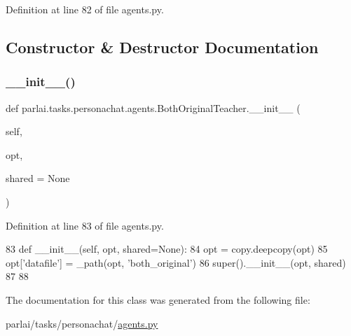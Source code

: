 Definition at line 82 of file agents.\+py.



\subsection{Constructor \& Destructor Documentation}
\mbox{\label{classparlai_1_1tasks_1_1personachat_1_1agents_1_1BothOriginalTeacher_a9d8162c6d1b012a1c9961f0aaedcb9cf}} 
\subsubsection{\texorpdfstring{\+\_\+\+\_\+init\+\_\+\+\_\+()}{\_\_init\_\_()}}
{\footnotesize\ttfamily def parlai.\+tasks.\+personachat.\+agents.\+Both\+Original\+Teacher.\+\_\+\+\_\+init\+\_\+\+\_\+ (\begin{DoxyParamCaption}\item[{}]{self,  }\item[{}]{opt,  }\item[{}]{shared = {\ttfamily None} }\end{DoxyParamCaption})}



Definition at line 83 of file agents.\+py.


\begin{DoxyCode}
83     \textcolor{keyword}{def }\_\_init\_\_(self, opt, shared=None):
84         opt = copy.deepcopy(opt)
85         opt[\textcolor{stringliteral}{'datafile'}] = \_path(opt, \textcolor{stringliteral}{'both\_original'})
86         super().\_\_init\_\_(opt, shared)
87 
88 
\end{DoxyCode}


The documentation for this class was generated from the following file\+:\begin{DoxyCompactItemize}
\item 
parlai/tasks/personachat/\hyperlink{parlai_2tasks_2personachat_2agents_8py}{agents.\+py}\end{DoxyCompactItemize}

